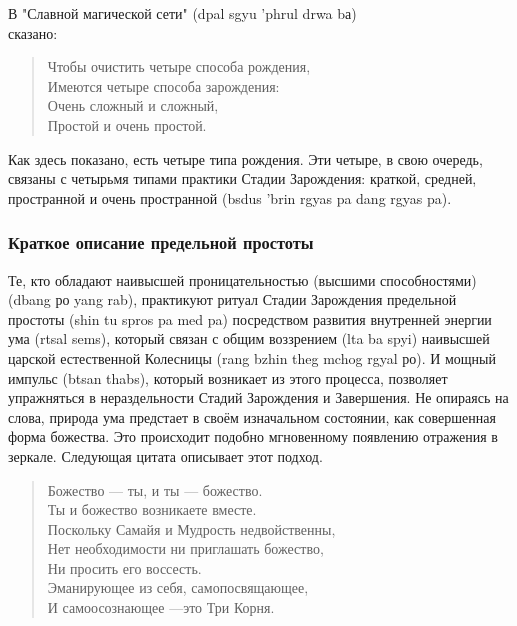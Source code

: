 В "Славной магической сети" (dpal sgyu 'phrul drwa bа)\\ сказано:\\

\begin{verse}
Чтобы очистить четыре способа рождения,\\
Имеются четыре способа зарождения:\\
Очень сложный и сложный,\\
Простой и очень простой.
\end{verse}

\begin{siderules}
Как здесь показано, есть четыре типа рождения. Эти четыре, в свою очередь, связаны с
четырьмя типами практики Стадии Зарождения: краткой, средней, простран\-ной и очень
пространной (bsdus 'brin rgyas pa dang rgyas pa).
\end{siderules}

\newpage
\subsubsection{Краткое описание предельной простоты}
\vspace{1cm}
Те, кто обладают наивысшей проницательностью (высшими способностями) (dbang ро
yang rab), практикуют ритуал Стадии Зарождения предельной простоты (shin tu spros pa med
pa) посредством развития внутренней энергии ума (rtsal sems), который связан с общим
воззрением (lta ba spyi) наивысшей царской естественной Колесницы (rang bzhin theg mchog
rgyal ро). И мощный импульс (btsan thabs), который возникает из этого процесса, позволяет
упражняться в нераздельности Стадий Зарождения и Завершения. Не опираясь на слова,
природа ума предстает в своём изначаль\-ном состоянии, как совершенная форма божества.
Это происходит подобно мгнове\-нному появлению отражения в зеркале. Следу\-ющая цитата
описывает этот подход.

\begin{verse}
Божество — ты, и ты — божество.\\
Ты и божество возникаете вместе.\\
Поскольку Самайя и Мудрость недвойственны,\\
Нет необходимости ни приглашать божество,\\
Ни просить его воссесть.\\
Эманирующее из себя, самопосвящающее,\\
И самоосознающее —это Три Корня.\\
\end{verse}

